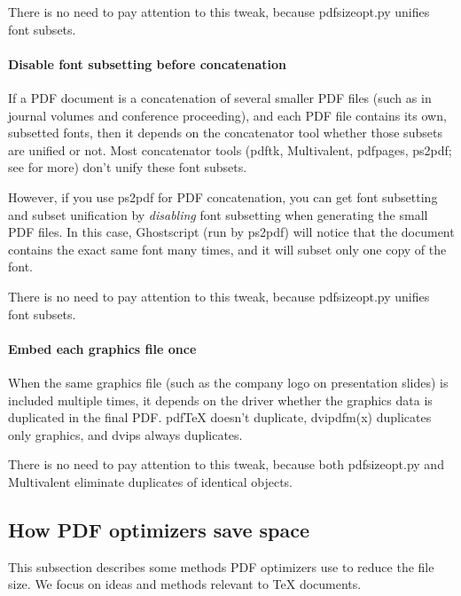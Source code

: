 \documentclass{ltugproc}
\def\cmd{\textsf}
\def\pkg{\textsf}
\begin{document}
There is no need to pay attention to this tweak, because
\cmd{pdfsizeopt.py} unifies font subsets.

\paragraph{Disable font subsetting before concatenation}

If a PDF document is a concatenation of several smaller PDF files (such as
in journal volumes and conference proceeding), and each PDF file contains
its own, subsetted fonts, then it depends on the concatenator tool whether
those subsets are unified or not. Most concatenator tools (\cmd{pdftk},
Multivalent, \pkg{pdfpages}, \cmd{ps2pdf}; see \cite{pdf-concatenate} for
more) don't unify these font subsets.

However, if you use \cmd{ps2pdf} for PDF concatenation, you can get font
subsetting and subset unification by \emph{disabling} font subsetting when
generating the small PDF files. In this case, Ghostscript (run by
\cmd{ps2pdf}) will notice that the document contains the exact same font
many times, and it will subset only one copy of the font.

There is no need to pay attention to this tweak, because
\cmd{pdfsizeopt.py} unifies font subsets.

\paragraph{Embed each graphics file once}

When the same graphics file
(such as the company logo on presentation slides)
is included multiple times, it depends
on the driver whether the graphics data is duplicated in the final PDF.
pdf\TeX{} doesn't duplicate, \cmd{dvipdfm(x)} duplicates only \MP{}
graphics, and \cmd{dvips} always duplicates.

There is no need to pay attention to this tweak, because
both \cmd{pdfsizeopt.py} and Multivalent eliminate duplicates of identical
objects.



\subsection{How PDF optimizers save space}\label{existing}

This subsection describes some methods PDF optimizers use to reduce the file
size. We focus on ideas and methods relevant to \TeX{} documents.
\end{document}
